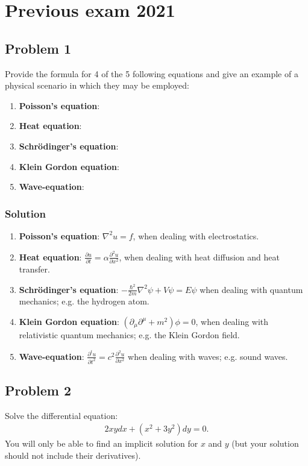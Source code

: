 \section{Previous exam 2021}

\subsection*{Problem 1}
Provide the formula for 4 of the 5 following equations and give an example of a physical scenario in which they may be employed:
\begin{enumerate}
    \item \textbf{Poisson's equation}:
    \item \textbf{Heat equation}:
    \item \textbf{Schrödinger's equation}:
    \item \textbf{Klein Gordon equation}:
    \item \textbf{Wave-equation}:
\end{enumerate}
\subsubsection*{Solution}
\begin{enumerate}
    \item \textbf{Poisson's equation}: $\nabla^2u = f$, when dealing with electrostatics.
    \item \textbf{Heat equation}: $\frac{\partial u}{\partial t} = \alpha \frac{\partial^2 u}{\partial x^2}$, when dealing with heat diffusion and heat transfer.
    \item \textbf{Schrödinger's equation}: $-\frac{\hbar^2}{2m}\nabla^2\psi + V\psi= E\psi$ when dealing with quantum mechanics; e.g. the hydrogen atom.
    \item \textbf{Klein Gordon equation}: $(\partial_\mu\partial^\mu + m^2)\phi = 0$, when dealing with relativistic quantum mechanics; e.g. the Klein Gordon field.
    \item \textbf{Wave-equation}: $\frac{\partial^t u}{\partial t^2} = c^2 \frac{\partial^2 u}{\partial x^2}$ when dealing with waves; e.g. sound waves.
\end{enumerate}

\subsection*{Problem 2}
Solve the differential equation:
\begin{align*}
    2xydx + (x^2 + 3y^2)dy = 0.
\end{align*}
\note You will only be able to find an implicit solution for $x$ and $y$ (but your solution should
not include their derivatives).

